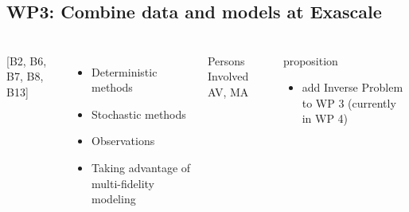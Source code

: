 \subsection{WP3: Combine data and models at Exascale }
\begin{frame}
  \frametitle{\insertsectionhead}
  \framesubtitle{\insertsubsectionhead}
  \begin{columns}
    [B2, B6, B7, B8, B13]
    \begin{itemize}
      \item Deterministic methods
      \item Stochastic methods
      \item Observations
      \item Taking advantage of multi-fidelity modeling
    \end{itemize}
    \begin{alertblock}{Persons Involved}
      AV, MA 
    \end{alertblock}
    \begin{alertblock}{proposition}
      \begin{itemize}
        \item add Inverse Problem to WP 3 (currently in WP 4)
      \end{itemize}
    \end{alertblock}
  \end{columns}
\end{frame}


